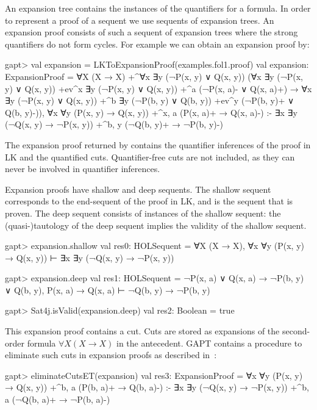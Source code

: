 \documentclass[a4paper,11pt]{book}
\newcommand{\impl}{\to} %
\newcommand{\cli}[1]{{\ttfamily {#1}}}
\begin{document}
An expansion tree contains the instances of the quantifiers for a formula.  In order
to represent a proof of a sequent we use sequents of expansion trees.  An
expansion proof consists of such a sequent of expansion trees where the
strong quantifiers do not form cycles.
For example we can obtain an expansion proof by:
\begin{clilisting}
gapt> val expansion = LKToExpansionProof(examples.fol1.proof)
val expansion: ExpansionProof = ∀X (X → X)
  +^{∀x ∃y (¬P(x, y) ∨ Q(x, y))}
    (∀x ∃y (¬P(x, y) ∨ Q(x, y)) +ev^{x}
        ∃y (¬P(x, y) ∨ Q(x, y))
        +^{a} (¬P(x, a)- ∨ Q(x, a)+) →
      ∀x ∃y (¬P(x, y) ∨ Q(x, y))
        +^{b} ∃y (¬P(b, y) ∨ Q(b, y)) +ev^{y} (¬P(b, y)+ ∨ Q(b, y)-)),
∀x ∀y (P(x, y) → Q(x, y)) +^{x, a} (P(x, a)+ → Q(x, a)-)
:-
∃x ∃y (¬Q(x, y) → ¬P(x, y)) +^{b, y} (¬Q(b, y)+ → ¬P(b, y)-)

\end{clilisting}

The expansion proof returned by \cli{LKToExpansionProof} contains the
quantifier inferences of the proof in LK and the quantified cuts.
Quantifier-free cuts are not included, as they can never be involved in
quantifier inferences.

Expansion proofs have shallow and deep sequents.  The shallow sequent
corresponds to the end-sequent of the proof in LK, and is the sequent that is
proven.  The deep sequent consists of instances of the shallow sequent: the
(quasi-)tautology of the deep sequent implies the validity of the shallow
sequent.
\begin{clilisting}
gapt> expansion.shallow
val res0: HOLSequent = ∀X (X → X), ∀x ∀y (P(x, y) → Q(x, y)) ⊢ ∃x ∃y (¬Q(x, y) → ¬P(x, y))

gapt> expansion.deep
val res1: HOLSequent = ¬P(x, a) ∨ Q(x, a) → ¬P(b, y) ∨ Q(b, y), P(x, a) → Q(x, a) ⊢ ¬Q(b, y) → ¬P(b, y)

gapt> Sat4j.isValid(expansion.deep)
val res2: Boolean = true

\end{clilisting}

This expansion proof contains a cut.  Cuts are stored as expansions of the
second-order formula $\forall X (X \impl X)$ in the antecedent.  GAPT contains
a procedure to eliminate such cuts in expansion proofs as described
in~\cite{Hetzl2013Expansion}:
\begin{clilisting}
gapt> eliminateCutsET(expansion)
val res3: ExpansionProof = ∀x ∀y (P(x, y) → Q(x, y)) +^{b, a} (P(b, a)+ → Q(b, a)-)
:-
∃x ∃y (¬Q(x, y) → ¬P(x, y)) +^{b, a} (¬Q(b, a)+ → ¬P(b, a)-)

\end{clilisting}
\end{document}
